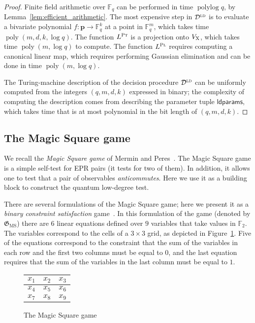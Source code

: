 \documentclass[11pt]{article}
\theoremstyle{definition}
\newcommand{\F}{\ensuremath{\mathbb{F}}}
\newcommand{\ld}{\textsc{ld}}
\DeclareMathOperator{\poly}{poly}
\DeclareMathOperator{\polylog}{polylog}
\newcommand{\pl}{\mathbf{p}}
\newcommand{\game}{\mathfrak{G}}
\newcommand{\decider}{\mathcal{D}}
\newcommand{\labelstyle}[1]{\ensuremath{\textsc{#1}}\xspace}
\newcommand{\xpt}{\labelstyle{X}}
\newcommand{\plf}{\labelstyle{Pl}}
\newcommand{\ptf}{\labelstyle{Pt}}
\newcommand{\ldparams}{\mathsf{ldparams}}
\newcommand{\MS}{\mathrm{MS}}
\begin{document}
\begin{proof}
	Finite field arithmetic over $\F_q$ can be performed in time $\polylog q$, by
  Lemma~\ref{lem:efficient_arithmetic}.
	The most expensive step in $\decider^\ld$ is to evaluate a bivariate
  polynomial $f: \pl \to \F_q^k$ at a point in $\F_q^m$, which takes time
  $\poly(m,d,k,\log q)$.
  The function $L^\ptf$ is a projection onto $V_\xpt$, which takes time
  $\poly(m,\log q)$ to compute.
  The function $L^\plf$ requires computing a canonical linear map, which
  requires performing Gaussian elimination and can be done in time $\poly(m,\log
  q)$.

  The Turing-machine description of the decision procedure $\decider^\ld$ can be
  uniformly computed from the integers $(q,m,d,k)$ expressed in binary; the
  complexity of computing the description comes from describing the parameter
  tuple $\ldparams$, which takes time that is at most polynomial in the bit
  length of $(q,m,d,k)$.
\end{proof}

\subsection{The Magic Square game}
\label{sec:ms}

We recall the \emph{Magic Square game} of Mermin and
Peres~\cite{mermin1990simple,peres1990incompatible,aravind2002simple}.
The Magic Square game is a simple self-test for EPR pairs (it tests for two of
them). %
In addition, it allows one to test that a pair of observables
\emph{anticommutes}.
Here we use it as a building block to construct the quantum low-degree test. 

There are several formulations of the Magic Square game; here we present it as a
\emph{binary constraint satisfaction} game~\cite{cleve2014characterization}.
In this formulation of the game (denoted by $\game_\MS$) there are $6$ linear
equations defined over $9$ variables that take values in $\F_2$.
The variables correspond to the cells of a $3 \times 3$ grid, as depicted in
Figure~\ref{fig:ms}.
Five of the equations correspond to the constraint that the sum of the variables
in each row and the first two columns must be equal to $0$, and the last
equation requires that the sum of the variables in the last column must be equal
to $1$.

\begin{figure}[ht!]
	\begin{center}
    \renewcommand{\arraystretch}{1.6}
		\begin{tabular}{|c|c|c|}
			\hline
			$x_1$ & $x_2$ & $x_3$ \\
			\hline 
			$x_4$ & $x_5$ & $x_6$ \\	
			\hline
			$x_7$ & $x_8$ & $x_9$ \\
			\hline
		\end{tabular}
		\caption{The Magic Square game}
		\label{fig:ms}
		\end{center}
\end{figure}
\end{document}
